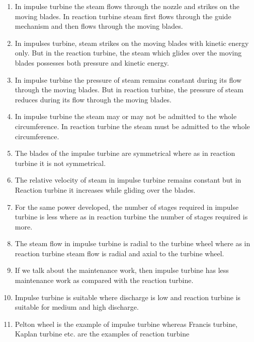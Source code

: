 \documentclass[11pt]{article}
\begin{document}
\begin{enumerate}
	\item In impulse turbine the steam flows through the nozzle and strikes on the moving blades. In reaction turbine steam first flows through the guide mechanism and then flows through the moving blades.
	\item In impulses turbine, steam strikes on the moving blades with kinetic energy only. But in the reaction turbine, the steam which glides over the moving blades possesses both pressure and kinetic energy.
	\item In impulse turbine the pressure of steam remains constant during its flow through the moving blades. But in reaction turbine, the pressure of steam reduces during its flow through the moving blades.
	\item In impulse turbine the steam may or may not be admitted to the whole circumference. In reaction turbine the steam must be admitted to the whole circumference.
	\item The blades of the impulse turbine are symmetrical where as in reaction turbine it is not symmetrical.
	\item The relative velocity of steam in impulse turbine remains constant but in Reaction turbine it increases while gliding over the blades.
	\item For the same power developed, the number of stages required in impulse turbine is less where as in reaction turbine the number of stages required is more.
	\item The steam flow in impulse turbine is radial to the turbine wheel where as in reaction turbine steam flow is radial and axial to the turbine wheel.
	\item If we talk about the maintenance work, then impulse turbine has less maintenance work as compared with the reaction turbine.
	\item Impulse turbine is suitable where discharge is low and reaction turbine is suitable for medium and high discharge.
	\item Pelton wheel is the example of impulse turbine whereas Francis turbine, Kaplan turbine etc. are the examples of reaction turbine
\end{enumerate}
\end{document}
